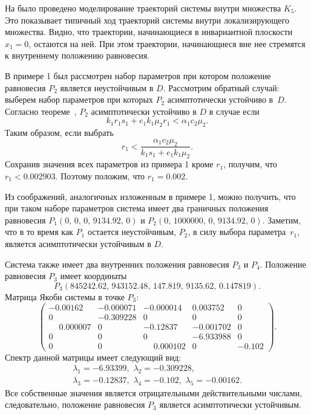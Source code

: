 \documentclass[14pt,a4paper]{extarticle}
\begin{document}
\begin{example}
		На  было проведено моделирование траекторий системы внутри множества $K_5$. Это показывает типичный ход траекторий системы внутри локализирующего множества. Видно, что траектории, начинающиеся в инвариантной плоскости $x_1=0$, остаются на ней. При этом траектории, начинающиеся вне нее стремятся к внутреннему положению равновесия.
	\end{example}
	
	\begin{example}
		В примере 1 был рассмотрен набор параметров при котором положение равновесия $P_2$ является неустойчивым в $D$. Рассмотрим обратный случай: выберем набор параметров при которых $P_2$ асимптотически устойчиво в~$D$. Согласно теореме~, $P_2$ асимптотически устойчиво в $D$ в случае если
		\[k_1r_1s_1 + e_1k_1\mu_2r_1 < \alpha_1c_2\mu_2.\]
		Таким образом, если выбрать 
		\[r_1 < \dfrac{\alpha_1c_2\mu_2}{k_1s_1 + e_1k_1\mu_2}.\]
		Сохранив значения всех параметров из примера 1 кроме $r_1$, получим, что $r_1 < 0.002903$. Поэтому положим, что $r_1=0.002$.
		
		Из соображений, аналогичных изложенным в примере 1, можно получить, что при таком наборе параметров система имеет два граничных положения равновесия $P_1\left(0,\,0,\,0,\,9134.92,\,0\right)$ и $P_2\left(0,\,1000000,\,0,\,9134.92,\,0\right)$. Заметим, что в то время как $P_1$ остается неустойчивым, $P_2$, в силу выбора параметра~$r_1$, является асимптотически устойчивым в $D$.
		
		Система также имеет два внутренних положения равновесия $P_3$ и $P_4$. Положение равновесия $P_3$ имеет координаты
		\[P_3\left(845242.62,\, 943152.48,\, 147.819,\, 9135.62,\, 0.147819\right).\]
		Матрица Якоби системы в точке $P_3$: 
		\[\begin{pmatrix}
			-0.00162 & -0.000071& -0.000014&  0.003752&  0\\
			 0  &     -0.309228  & 0     &   0     &   0\\
			 \phantom{-}0.000007 & 0    &   -0.12837&  -0.001702 & 0\\
			 0&        0&        0     &  -6.933988&  0\\
			 0 &       0&        \phantom{-}0.000102 & 0 &       -0.102
		\end{pmatrix}.\]
		Спектр данной матрицы имеет следующий вид:
		\begin{multline*}
			\lambda_1=-6.93399,\,\, \lambda_2=-0.309228,\\
			\lambda_3=-0.12837,\,\, \lambda_4=-0.102,\,\, \lambda_5=-0.00162.
		\end{multline*}
		Все собственные значения является отрицательными действительными числами, следовательно, положение равновесия $P_3$ является асимптотически устойчивым.
		

\end{example}
\end{document}
